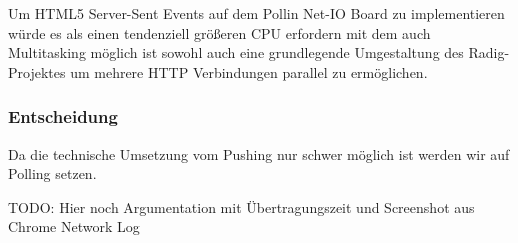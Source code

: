 Um HTML5 Server-Sent Events auf dem Pollin Net-IO Board zu implementieren würde es als
einen tendenziell größeren CPU erfordern mit dem auch Multitasking möglich ist sowohl auch
eine grundlegende Umgestaltung des Radig-Projektes um mehrere HTTP Verbindungen parallel
zu ermöglichen.

\subsubsection{Entscheidung}
Da die technische Umsetzung vom Pushing nur schwer möglich ist werden wir auf Polling
setzen.

TODO: Hier noch Argumentation mit Übertragungszeit und Screenshot aus Chrome Network Log


%
